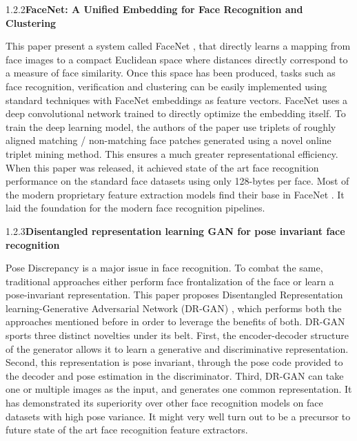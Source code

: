 \documentclass[12pt]{article}
\renewcommand{\_}{\kern-1.5pt\textunderscore\kern-1.5pt}
\begin{document}
\vspace{\baselineskip}
1.2.2\tab \textbf{FaceNet: A Unified Embedding for Face Recognition and Clustering}\par
This paper present a system called FaceNet \cite{schroff2015facenet} , that directly learns a mapping from face images to a compact Euclidean space where distances directly correspond to a measure of face similarity. Once this space has been produced, tasks such as face recognition, verification and clustering can be easily implemented using standard techniques with FaceNet embeddings \cite{schroff2015facenet}  as feature vectors. FaceNet  \cite{schroff2015facenet}  uses a deep convolutional network trained to directly optimize the embedding itself. To train the deep learning model, the authors of the paper use triplets of roughly aligned matching / non-matching face patches generated using a novel online triplet mining method. This ensures a much greater representational efficiency. When this paper was released, it achieved state of the art face recognition performance on the standard face datasets using only 128-bytes per face. Most of the modern proprietary feature extraction models find their base in FaceNet \cite{schroff2015facenet} . It laid the foundation for the modern face recognition pipelines.\par

\vspace{\baselineskip}
1.2.3\tab \textbf{Disentangled representation learning GAN for pose invariant face recognition}\par
Pose Discrepancy is a major issue in face recognition. To combat the same, traditional approaches either perform face frontalization of the face or learn a pose-invariant representation. This paper proposes Disentangled Representation learning-Generative Adversarial Network (DR-GAN) \cite{tran2017disentangled} , which performs both the approaches mentioned before in order to leverage the benefits of both. DR-GAN  \cite{tran2017disentangled}  sports three distinct novelties under its belt. First, the encoder-decoder structure of the generator allows it to learn a generative and discriminative representation. Second, this representation is pose invariant, through the pose code provided to the decoder and pose estimation in the discriminator. Third, DR-GAN  \cite{tran2017disentangled}  can take one or multiple images as the input, and generates one common representation. It has demonstrated its superiority over other face recognition models on face datasets with high pose variance. It might very well turn out to be a precursor to future state of the art face recognition feature extractors.\par
\end{document}
